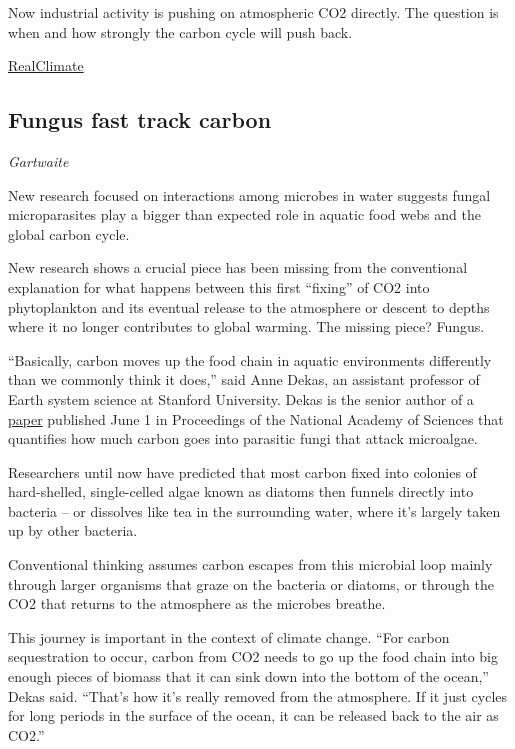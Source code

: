 \documentclass[
]{book}
\begin{document}
Now industrial activity is pushing on atmospheric CO2 directly. The question is when and how strongly the carbon cycle will push back.

\href{https://www.realclimate.org/index.php/archives/2007/11/is-the-ocean-carbon-sink-sinking/}{RealClimate}

\hypertarget{fungus-fast-track-carbon}{%
\subsection{Fungus fast track carbon}\label{fungus-fast-track-carbon}}

\emph{Gartwaite}

New research focused on interactions among microbes in water suggests fungal microparasites play a bigger than expected role in aquatic food webs and the global carbon cycle.

New research shows a crucial piece has been missing from the conventional explanation for what happens between this first ``fixing'' of CO2 into phytoplankton and its eventual release to the atmosphere or descent to depths where it no longer contributes to global warming. The missing piece? Fungus.

``Basically, carbon moves up the food chain in aquatic environments differently than we commonly think it does,'' said Anne Dekas, an assistant professor of Earth system science at Stanford University. Dekas is the senior author of a
\href{https://doi.org/10.1073/pnas.2102225118}{paper}
published June 1 in Proceedings of the National Academy of Sciences that quantifies how much carbon goes into parasitic fungi that attack microalgae.

Researchers until now have predicted that most carbon fixed into colonies of hard-shelled, single-celled algae known as diatoms then funnels directly into bacteria -- or dissolves like tea in the surrounding water, where it's largely taken up by other bacteria.

Conventional thinking assumes carbon escapes from this microbial loop mainly through larger organisms that graze on the bacteria or diatoms, or through the CO2 that returns to the atmosphere as the microbes breathe.

This journey is important in the context of climate change. ``For carbon sequestration to occur, carbon from CO2 needs to go up the food chain into big enough pieces of biomass that it can sink down into the bottom of the ocean,'' Dekas said. ``That's how it's really removed from the atmosphere. If it just cycles for long periods in the surface of the ocean, it can be released back to the air as CO2.''
\end{document}
